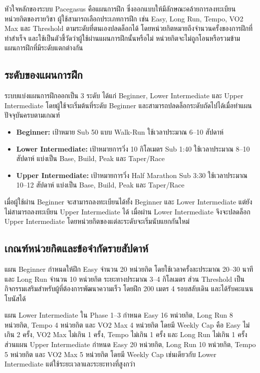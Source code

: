 หัวใจหลักของระบบ Pacegasus คือแผนการฝึก ซึ่งออกแบบให้มีลักษณะคล้ายการลงทะเบียนหน่วยกิตของรายวิชา ผู้ใช้สามารถเลือกประเภทการฝึก เช่น Easy, Long Run, Tempo, VO2 Max และ Threshold ตามระดับที่ตนเองปลดล็อกได้ โดยหน่วยกิตหมายถึงจำนวนครั้งของการฝึกที่ทำสำเร็จ และใช้เป็นตัวชี้วัดว่าผู้ใช้ผ่านแผนการฝึกนั้นหรือไม่ หน่วยกิตจะไม่ถูกโอนหรือรวมข้ามแผนการฝึกที่มีระดับแตกต่างกัน

\subsection{ระดับของแผนการฝึก}

ระบบแบ่งแผนการฝึกออกเป็น 3 ระดับ ได้แก่ Beginner, Lower Intermediate และ Upper Intermediate โดยผู้ใช้จะเริ่มต้นที่ระดับ Beginner และสามารถปลดล็อกระดับถัดไปได้เมื่อทำแผนปัจจุบันครบตามเกณฑ์

\begin{itemize}
    \item \textbf{Beginner:} เป้าหมาย Sub 50 แบบ Walk-Run ใช้เวลาประมาณ 6--10 สัปดาห์
    \item \textbf{Lower Intermediate:} เป้าหมายการวิ่ง 10 กิโลเมตร Sub 1:40 ใช้เวลาประมาณ 8--10 สัปดาห์ แบ่งเป็น Base, Build, Peak และ Taper/Race
    \item \textbf{Upper Intermediate:} เป้าหมายการวิ่ง Half Marathon Sub 3:30 ใช้เวลาประมาณ 10--12 สัปดาห์ แบ่งเป็น Base, Build, Peak และ Taper/Race
\end{itemize}

เมื่อผู้ใช้ผ่าน Beginner จะสามารถลงทะเบียนได้ทั้ง Beginner และ Lower Intermediate แต่ยังไม่สามารถลงทะเบียน Upper Intermediate ได้ เมื่อผ่าน Lower Intermediate จึงจะปลดล็อก Upper Intermediate โดยหน่วยกิตของแต่ละระดับจะเริ่มนับแยกกันใหม่

\subsection{เกณฑ์หน่วยกิตและข้อจำกัดรายสัปดาห์}

แผน Beginner กำหนดให้ฝึก Easy จำนวน 20 หน่วยกิต โดยใช้เวลาครั้งละประมาณ 20--30 นาที และ Long Run จำนวน 10 หน่วยกิต ระยะทางประมาณ 3--4 กิโลเมตร ส่วน Threshold เป็นกิจกรรมเสริมสำหรับผู้ที่ต้องการพัฒนาความเร็ว โดยฝึก 200 เมตร 4 รอบสลับเดิน และได้รับคะแนนโบนัสได้

แผน Lower Intermediate ใน Phase 1--3 กำหนด Easy 16 หน่วยกิต, Long Run 8 หน่วยกิต, Tempo 4 หน่วยกิต และ VO2 Max 4 หน่วยกิต โดยมี Weekly Cap คือ Easy ไม่เกิน 2 ครั้ง, VO2 Max ไม่เกิน 1 ครั้ง, Tempo ไม่เกิน 1 ครั้ง และ Long Run ไม่เกิน 1 ครั้ง ส่วนแผน Upper Intermediate กำหนด Easy 20 หน่วยกิต, Long Run 10 หน่วยกิต, Tempo 5 หน่วยกิต และ VO2 Max 5 หน่วยกิต โดยมี Weekly Cap เช่นเดียวกับ Lower Intermediate แต่ใช้ระยะเวลาและระยะทางที่สูงกว่า

